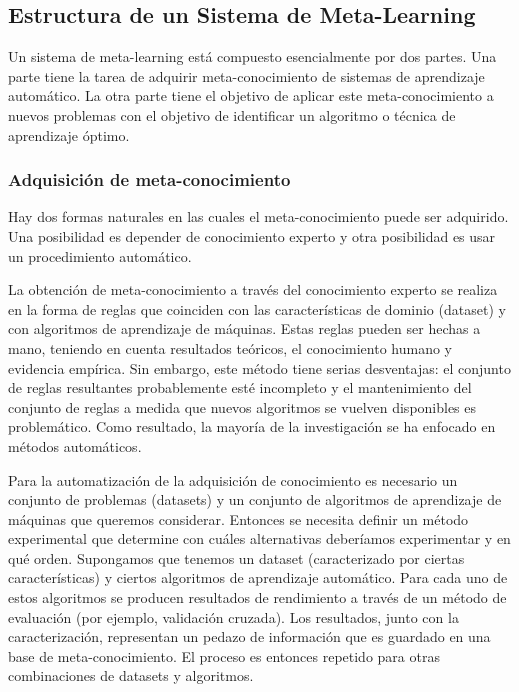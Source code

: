 \subsection{Estructura de un Sistema de Meta-Learning}

Un sistema de meta-learning está compuesto esencialmente por dos partes. Una parte tiene la tarea de adquirir meta-conocimiento de sistemas de aprendizaje automático. La otra parte tiene el objetivo de aplicar este meta-conocimiento a nuevos problemas con el objetivo de identificar un algoritmo o técnica de aprendizaje óptimo.

\subsubsection{Adquisición de meta-conocimiento} 

Hay dos formas naturales en las cuales el meta-conocimiento puede ser adquirido. Una posibilidad es depender de conocimiento experto y otra posibilidad es usar un procedimiento automático. 

La obtención de meta-conocimiento a través del conocimiento experto se realiza en la forma de reglas que coinciden con las características de dominio (dataset) y con algoritmos de aprendizaje de máquinas. Estas reglas pueden ser hechas a mano, teniendo en cuenta resultados teóricos, el conocimiento humano y evidencia empírica. Sin embargo, este método tiene serias desventajas: el conjunto de reglas resultantes probablemente esté incompleto y el mantenimiento del conjunto de reglas a medida que nuevos algoritmos se vuelven disponibles es problemático. Como resultado, la mayoría de la investigación se ha enfocado en métodos automáticos.
	
Para la automatización de la adquisición de conocimiento es necesario un conjunto de problemas (datasets) y un conjunto de algoritmos de aprendizaje de máquinas que queremos considerar. Entonces se necesita definir un método experimental que determine con cuáles alternativas deberíamos experimentar y en qué orden. Supongamos que tenemos un dataset (caracterizado por ciertas características) y ciertos algoritmos de aprendizaje automático. Para cada uno de estos algoritmos se producen resultados de rendimiento a través de un método de evaluación (por ejemplo, validación cruzada). Los resultados, junto con la caracterización, representan un pedazo de información que es guardado en una base de meta-conocimiento. El proceso es entonces repetido para otras combinaciones de datasets y algoritmos.

